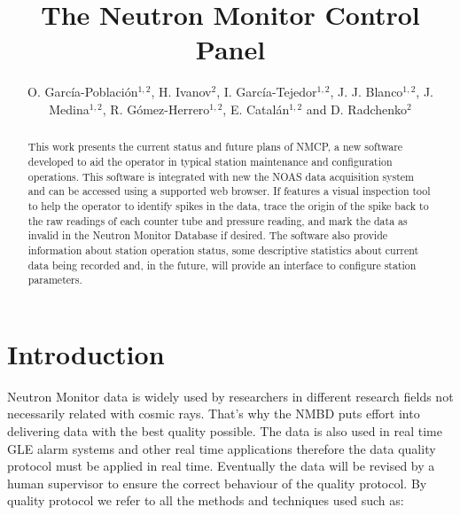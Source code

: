 \documentclass[a4paper]{jpconf}
\begin{document}
\title{The Neutron Monitor Control Panel}

\author{O. García-Población$^{1,2}$, H. Ivanov$^2$, I. García-Tejedor$^{1,2}$,
J. J. Blanco$^{1,2}$, J. Medina$^{1,2}$, R. Gómez-Herrero$^{1,2}$, E.
Catalán$^{1,2}$ and D. Radchenko$^{2}$}

\address{$^1$ Space Research Group, University of Alcalá, Spain}
\address{$^2$ Castilla-La Mancha Neutron Monitor, Parque Tecnológico de Guadalajara, Spain}


\begin{abstract}
    This work presents the current status and future plans of NMCP, a new
    software developed to aid the operator in typical station maintenance and
    configuration operations. This software is integrated with new the NOAS
    data acquisition system and can be accessed using a supported web browser.
    If features a visual inspection tool to help the operator to identify
    spikes in the data, trace the origin of the spike back to the raw readings
    of each counter tube and pressure reading, and mark the data as invalid in
    the Neutron Monitor Database if desired. The software also provide
    information about station operation status, some descriptive statistics
    about current data being recorded and, in the future, will provide an
    interface to configure station parameters.
\end{abstract}

\section{Introduction}

Neutron Monitor data is widely used by researchers in different research fields
not necessarily related with cosmic rays. That's why the NMBD\cite{NMDB2011}
puts effort into delivering data with the best quality possible. The data is
also used in real time GLE alarm systems and other real time applications
therefore the data quality protocol must be applied in real time. Eventually
the data will be revised by a human supervisor to ensure the correct behaviour
of the quality protocol. By quality protocol we refer to all the methods and
techniques used such as:
\end{document}
